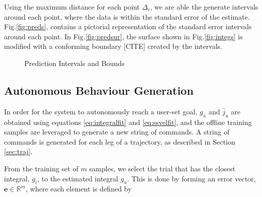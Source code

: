 \documentclass[letterpaper, 10 pt, conference]{ieeeconf}  %
\newcommand{\R}{\mathbb{R}}
\begin{document}
Using the maximum distance for each point $\Delta_i$, we are able the generate intervals around each point, where the data is within the standard error of the estimate. Fig.\ref{fig:preds}, contains a pictorial representation of the standard error intervals around each point. In Fig.\ref{fig:predsur}, the surface shown in Fig.\ref{fig:integs} is modified with a conforming boundary [CITE] created by the intervals.

\begin{figure}[ht]
	\centering
	\caption{Prediction Intervals and Bounds}
	\label{fig:bounds}
\end{figure}


\subsection{Autonomous Behaviour Generation}

In order for the system to autonomously reach a user-set goal, $g_u$ and $\bar{j}_u$ are obtained using equations \eqref{eq:integralfit} and \eqref{eq:ssvelfit}, and the offline training samples are leveraged to generate a new string of commands. A string of commands is generated for each leg of a trajectory, as described in Section \ref{sec:traj}.

From the training set of $m$ samples, we select the trial that has the closest integral, $g_i$, to the estimated integral $g_u$. This is done by forming an error vector, $\mathbf{e}\in\R^{m}$, where each element is defined by
\end{document}
